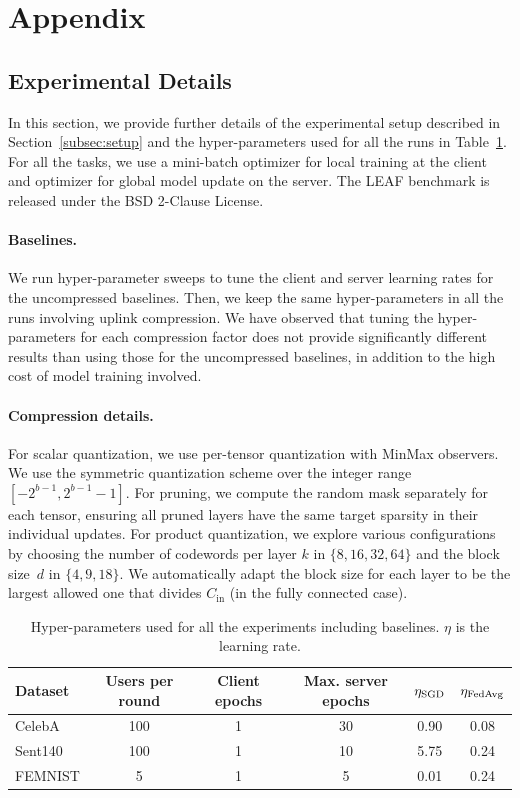 \clearpage 
\section{Appendix}

\subsection{Experimental Details}
\label{appendix:exp_details}
In this section, we provide further details of the experimental setup described in Section~\ref{subsec:setup} and the hyper-parameters used for all the runs in Table~\ref{tab:hp}. For all the tasks, we use a mini-batch \SGD optimizer for local training at the client and \FedAvg optimizer for global model update on the server. The LEAF benchmark is released under the BSD 2-Clause License.

\paragraph{Baselines.} We run hyper-parameter sweeps to tune the client and server learning rates for the uncompressed baselines. Then, we keep the same hyper-parameters in all the runs involving uplink compression. We have observed that tuning the hyper-parameters for each compression factor does not provide significantly different results than using those for the uncompressed baselines, in addition to the high cost of model training involved. 

\paragraph{Compression details.}For scalar quantization, we use per-tensor quantization with MinMax observers. We use the symmetric quantization scheme over the integer range $[-2^{b-1}, 2^{b-1} - 1]$. For pruning, we compute the random mask separately for each tensor, ensuring all pruned layers have the same target sparsity in their individual updates. For product quantization, we explore various configurations by choosing the number of codewords per layer $k$ in $\{8, 16, 32, 64\}$ and the block size~$d$ in $\{4, 9, 18\}$. We automatically adapt the block size for each layer to be the largest allowed one that divides $C_{\text{in}}$ (in the fully connected case).

\begin{table}[!ht]
 \caption{Hyper-parameters used for all the experiments including baselines. $\eta$ is the learning rate.}
    \centering
    \begin{tabular}{l|ccccc}
    \toprule
    Dataset & Users per round & Client epochs & Max. server epochs & $\eta_\mathrm{{\sc SGD}}$ & $\eta_\mathrm{{\sc FedAvg}}$ \\
    \midrule
    CelebA & 100 & 1 & 30 & 0.90 & 0.08 \\
    Sent140 & 100 & 1 & 10 & 5.75 & 0.24 \\
    FEMNIST & 5 & 1 & 5 & 0.01 & 0.24 \\
    \bottomrule
    \end{tabular}
    \label{tab:hp}
\end{table}


